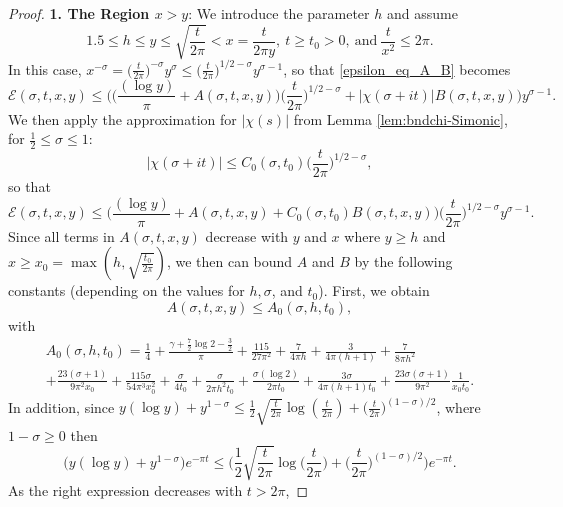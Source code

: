 \documentclass[11pt,letterpaper,oneside,reqno]{amsart}
\renewcommand{\^}[1]{\widehat{#1}}
\newcommand{\s}{\sigma}
\numberwithin{equation}{section}
\theoremstyle{remark}
\begin{document}
\begin{proof}
\smallskip
\textbf{1. The Region $x > y$}: 
We introduce the parameter $h$ and assume 
\[
1.5 \leq h \leq y  \leq \sqrt{\frac{t}{2\pi}} < x = \frac{t}{2\pi y}, \  t  \geq t_0 > 0, \  \text{and} \ \frac{t}{x^2}  \leq  2\pi.
\]
%
In this case, $x^{-\s} = \big(\frac{t}{2\pi}\big)^{-\s} y^{\s}\leq \big(\frac{t}{2\pi}\big)^{1/2-\s} y^{\s-1}$, so that \eqref{epsilon_eq_A_B} becomes
\begin{equation}
 \mathcal{E}(\sigma,t,x,y) \leq \Big( \Big(  \frac{(\log y)}{\pi} +A(\sigma,t,x,y) \Big)\Big( \frac{t}{2\pi} \Big)^{1/2-\sigma} + |\chi(\sigma+it)| B(\sigma,t,x,y) \Big) y^{\sigma-1}. 
\end{equation}
We then apply the approximation for $|\chi(s)|$ from Lemma \ref{lem:bndchi-Simonic}, for $\frac{1}{2}\le \sigma\le 1$:
     \[
     |\chi(\sigma+it)| 
 \leq
 C_0(\sigma,t_0)  \Big( \frac{t}{2\pi} \Big)^{1/2-\sigma},
 \]
so that
\begin{equation}
   \mathcal{E}(\sigma,t,x,y) \leq \Big( 
 \frac{(\log y)}{\pi} 
   +A(\sigma,t,x,y)   + C_0(\sigma,t_0) B(\sigma,t,x,y) \Big) \Big( \frac{t}{2\pi} \Big)^{1/2-\sigma} y^{\sigma-1}.
\end{equation}
Since all terms in $A(\sigma,t,x,y)$ decrease with $y$ and $x$ where $y \geq h$ and $x\ge x_0 = \max\left(h, \sqrt{\frac{t_0}{2\pi}}\right)$, we then can bound $A$ and $B$ by the following constants (depending on the values for $h, \sigma$, and $t_0$).
First, we obtain 
\[  A(\s,t,x,y) \leq A_0(\sigma,h,t_0),\] with 
\begin{multline}\label{def-A0}
A_0(\sigma,h, t_0) 
=
\frac{1}4 +\frac{\gamma+ \frac{7}{2}\log 2-\frac{3}{2}}{\pi} 
+ \frac{115}{27\pi^2} 
+ \frac{7}{4\pi h} +  \frac{3}{4\pi(h+1)}
+ \frac{7}{8\pi h^2} 
\\+ \frac{23(\sigma+1)}{9\pi^2 x_0 } 
+ \frac{115 \sigma}{54\pi^3 x_0^2 }
 + \frac{\sigma }{4 t_0}
 + \frac{\sigma }{2\pi h^2 t_0} 
 + \frac{ \sigma  (\log 2 )}{2\pi t_0} 
 + \frac{ 3 \sigma }{4\pi (h+1) t_0}
 + \frac{23\sigma (\sigma+1)}{9\pi^2} \frac{1}{x_0  t_0} .
\end{multline}
%
In addition, since $y (\log y)+y^{1-\sigma} \leq \frac{1}{2} \sqrt{\frac{t}{2\pi}} \log\left(\frac{t}{2\pi}\right) + \big(\frac{t}{2\pi}\big)^{(1-\sigma)/2} $, where $1-\sigma\geq 0$ then 
\[
\big(y (\log y)+y^{1-\sigma}\big) e^{-\pi t} 
\leq \bigg(\frac{1}{2} \sqrt{\frac{t}{2\pi}} \log\Big(\frac{t}{2\pi}\Big) + \big(\frac{t}{2\pi}\big)^{(1-\sigma)/2}\bigg)  e^{- \pi t}.
\]
As the right expression decreases with $t>2\pi$, 

\end{proof}
\end{document}
